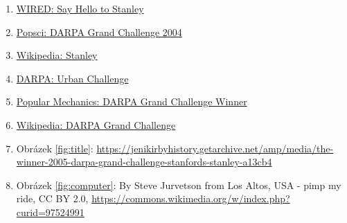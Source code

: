 \documentclass[12pt]{article}
\begin{document}
\begin{enumerate}
    \item \href{https://www.wired.com/2006/01/stanley/}{WIRED: Say Hello to Stanley}
    \item \href{https://web.archive.org/web/20070510134920/http://www.popsci.com/popsci/darpachallenge/6182640a662c6010vgnvcm1000004eecbccdrcrd.html}{Popsci: DARPA Grand Challenge 2004}
    \item \href{https://en.wikipedia.org/wiki/Stanley_(vehicle)}{Wikipedia: Stanley}
    \item \href{https://web.archive.org/web/20090114213826/http://www.darpa.mil/GRANDCHALLENGE/overview.asp}{DARPA: Urban Challenge}
    \item \href{https://web.archive.org/web/20061113154833/http://www.popularmechanics.com/science/robotics/2169012.html?page=1}{Popular Mechanics: DARPA Grand Challenge Winner} 
    \item \href{https://en.wikipedia.org/wiki/DARPA_Grand_Challenge}{Wikipedia: DARPA Grand Challenge}
    \item Obrázek \ref{fig:title}: \url{https://jenikirbyhistory.getarchive.net/amp/media/the-winner-2005-darpa-grand-challenge-stanfords-stanley-a13cb4}
    \item Obrázek \ref{fig:computer}: By Steve Jurvetson from Los Altos, USA - pimp my ride, CC BY 2.0, \url{https://commons.wikimedia.org/w/index.php?curid=97524991}
\end{enumerate}
\end{document}
